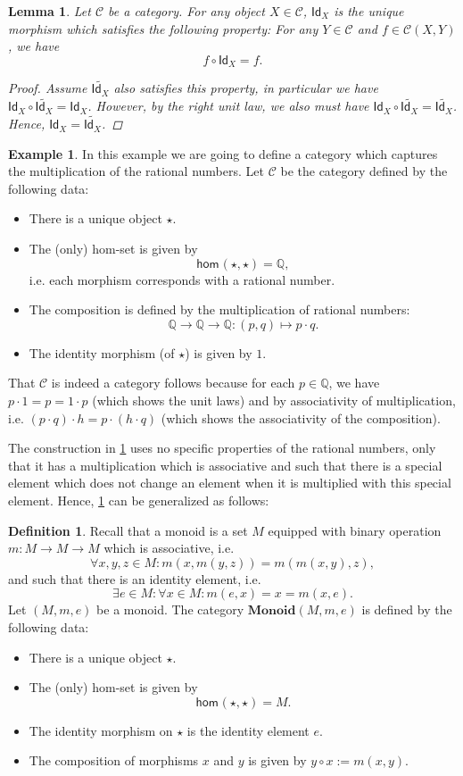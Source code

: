 \documentclass[a4paper,10pt]{scrartcl}
\theoremstyle{plain}
\newtheorem{lemma}[thm]{Lemma}
\theoremstyle{definition}
\newtheorem{dfn}[thm]{Definition}
\newtheorem{exa}[thm]{Example}
\newcommand{\cfont}[1]{\ensuremath{\mathsf{#1}}}
\newcommand{\Cat}[1]{\mathcal{#1}}
\newcommand{\CC}{\Cat{C}}
\newcommand{\Catb}[1]{\mathbf{#1}}
\newcommand{\MON}{\Catb{Monoid}}
\newcommand{\Hom}[3][]{\cfont{hom}_{#1}(#2,#3)}
\newcommand{\CHom}[3]{{#1}(#2,#3)}
\newcommand{\Id}[1][]{\cfont{Id}_{#1}}
\newcommand{\co}[2]{\ensuremath{#2 \circ #1}}
\begin{document}
\begin{lemma}\label{lemma:uniqueid} Let $\CC$ be a category. For any object $X\in\CC$, $\Id[X]$ is the unique morphism which satisfies the following property: For any $Y\in\CC$ and $f\in\CHom \CC X Y$, we have 
\[
\co{\Id[X]} f = f.
\]
\begin{proof}
Assume $\tilde{\Id[X]}$ also satisfies this property, in particular we have $\co {\tilde{\Id[X]}} {\Id[X]} = \Id[X]$. However, by the right unit law, we also must have $\co{\tilde{\Id[X]}}{\Id[X]} = \tilde{\Id[X]}$. Hence, $\Id[X] = \tilde{\Id[X]}$.
\end{proof}
\end{lemma}

\begin{exa}\label{exa:monoidofrationalnumbers} In this example we are going to define a category which captures the multiplication of the rational numbers. Let $\CC$ be the category defined by the following data:
\begin{itemize}
\item There is a unique object $\star$.
\item The (only) hom-set is given by
\[
\Hom{\star}{\star} = \mathbb{Q},
\]
i.e. each morphism corresponds with a rational number.
\item The composition is defined by the multiplication of rational numbers:
\[
\mathbb{Q} \to\mathbb{Q}\to\mathbb{Q} : (p,q)\mapsto p\cdot q.
\]
\item The identity morphism (of $\star$) is given by $1$.
\end{itemize}
That $\CC$ is indeed a category follows because for each $p\in\mathbb{Q}$, we have $p\cdot 1 = p = 1\cdot p$ (which shows the unit laws) and by associativity of multiplication, i.e. $(p\cdot q)\cdot h = p\cdot (h \cdot q)$ (which shows the associativity of the composition).
\end{exa}
The construction in \cref{exa:monoidofrationalnumbers} uses no specific properties of the rational numbers, only that it has a multiplication which is associative and such that there is a special element which does not change an element when it is multiplied with this special element. Hence, \cref{exa:monoidofrationalnumbers} can be generalized as follows:
\begin{dfn}\label{monoidcategory}
Recall that a monoid is a set $M$ equipped with binary operation $m : M \to M \to M$ which is associative, i.e. 
$$\forall x,y,z\in M: m(x,m(y,z)) = m(m(x,y),z),$$
and such that there is an identity element, i.e. 
\[
\exists e\in M: \forall x\in M: m(e,x)=x=m(x,e).
\]
Let $(M,m,e)$ be a monoid. The category $\MON(M,m,e)$ is defined by the following data:
\begin{itemize}
\item There is a unique object $\star$.
\item The (only) hom-set is given by 
\[
\Hom{\star}{\star} = M.
\]
\item The identity morphism on $\star$ is the identity element $e$.
\item The composition of morphisms $x$ and $y$ is given by $\co{x}{y} := m(x,y)$.
\end{itemize}
\end{dfn}
\end{document}
